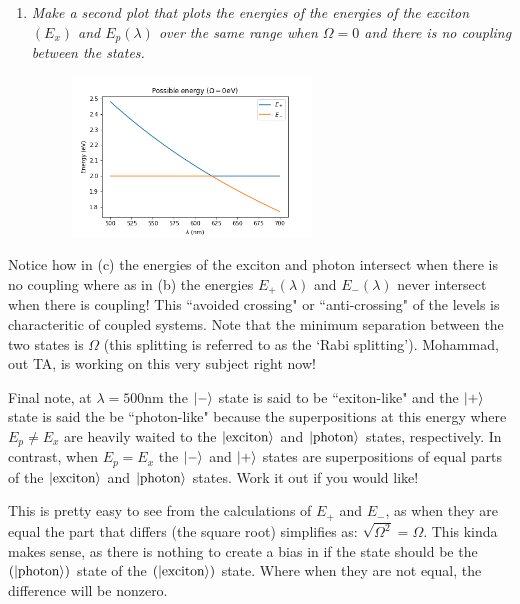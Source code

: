 \documentclass[12pt]{article}
\begin{document}
\begin{enumerate}[label=\alph*)]
\item \emph{Make a second plot that plots the energies of the energies of the exciton $(E_x)$ and $E_p(\lambda)$ over the same range when $\Omega = 0$ and there is no coupling between the states.}

\begin{figure}[!ht]
\centering
\includegraphics[width=0.60\textwidth]{./hw09_2.png}
\label{fig:1_2}
\end{figure}
\end{enumerate}

Notice how in (c) the energies of the exciton and photon intersect when there is no coupling where as in (b) the energies $E_+(\lambda)$ and $E_-(\lambda)$ never intersect when there is coupling! This ``avoided crossing" or ``anti-crossing" of the levels is characteritic of coupled systems. Note that the minimum separation between the two states is $\Omega$ (this splitting is referred to as the `Rabi splitting'). Mohammad, out TA, is working on this very subject right now! 

Final note, at $\lambda = 500$nm the $\ket{-}$ state is said to be ``exiton-like" and the $\ket{+}$ state is said the be ``photon-like" because the superpositions at this energy where $E_p \neq E_x$ are heavily waited to the $\ket{\text{exciton}}$ and $\ket{\text{photon}}$ states, respectively. In contrast, when $E_p = E_x$ the $\ket{-}$ and $\ket{+}$ states are superpositions of equal parts of the $\ket{\text{exciton}}$ and $\ket{\text{photon}}$ states. Work it out if you would like! 
\bigskip

This is pretty easy to see from the calculations of $E_+$ and $E_-$, as when they are equal the part that differs (the square root) simplifies as: $\sqrt{\Omega^2} = \Omega$. This kinda makes sense, as there is nothing to create a bias in if the state should be the $(\ket{\text{photon}})$ state of the $(\ket{\text{exciton}})$ state. Where when they are not equal, the difference will be nonzero. 
\end{document}
